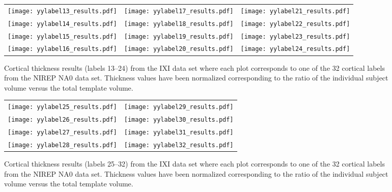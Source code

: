 \begin{figure*}
  \centering
  \begin{tabular}{ccc}
  \texttt{[image: yylabel13\_results.pdf]} &
  \texttt{[image: yylabel17\_results.pdf]} &
  \texttt{[image: yylabel21\_results.pdf]} \\
  \texttt{[image: yylabel14\_results.pdf]} &
  \texttt{[image: yylabel18\_results.pdf]} &
  \texttt{[image: yylabel22\_results.pdf]} \\
  \texttt{[image: yylabel15\_results.pdf]} &
  \texttt{[image: yylabel19\_results.pdf]} &
  \texttt{[image: yylabel23\_results.pdf]} \\
  \texttt{[image: yylabel16\_results.pdf]} &
  \texttt{[image: yylabel20\_results.pdf]} &
  \texttt{[image: yylabel24\_results.pdf]} \\
  \end{tabular}
  \caption{Cortical thickness results (labels 13--24) from the IXI data set where
  each plot corresponds to one of the 32 cortical labels from the NIREP NA0 data set.  
  Thickness values have been normalized corresponding to the ratio of the individual 
  subject volume versus the total template volume.
  }
  \label{fig:nirep2}
\end{figure*}

\begin{figure*}
  \centering
  \begin{tabular}{cc}
  \texttt{[image: yylabel25\_results.pdf]} &
  \texttt{[image: yylabel29\_results.pdf]} \\
  \texttt{[image: yylabel26\_results.pdf]} &
  \texttt{[image: yylabel30\_results.pdf]} \\
  \texttt{[image: yylabel27\_results.pdf]} &
  \texttt{[image: yylabel31\_results.pdf]} \\
  \texttt{[image: yylabel28\_results.pdf]} &
  \texttt{[image: yylabel32\_results.pdf]} \\
  \end{tabular}
  \caption{Cortical thickness results (labels 25--32) from the IXI data set where
  each plot corresponds to one of the 32 cortical labels from the NIREP NA0 data set.  
  Thickness values have been normalized corresponding to the ratio of the individual 
  subject volume versus the total template volume.
  }
  \label{fig:nirep3}
\end{figure*}

